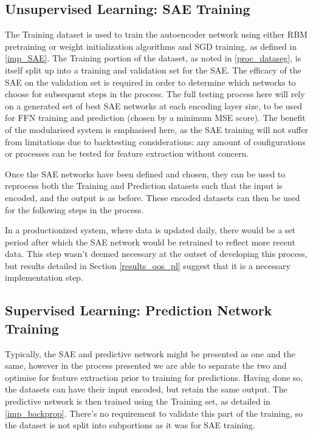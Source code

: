 \documentclass[a4paper,11pt,oneside]{article}
\theoremstyle{plain}
\theoremstyle{definition}
\begin{document}
	\subsection{Unsupervised Learning: SAE Training}\label{proc_sae}
	
	The Training dataset is used to train the autoencoder network using either RBM pretraining or weight initialization algorithms and SGD training, as defined in \ref{imp_SAE}. The Training portion of the dataset, as noted in \ref{proc_dataseg}, is itself split up into a training and validation set for the SAE. The efficacy of the SAE on the validation set is required in order to determine which networks to choose for subsequent steps in the process. The full testing process here will rely on a generated set of best SAE networks at each encoding layer size, to be used for FFN training and prediction (chosen by a minimum MSE score). The benefit of the modularised system is emphasised here, as the SAE training will not suffer from limitations due to backtesting considerations: any amount of configurations or processes can be tested for feature extraction without concern. \newline
	
	Once the SAE networks have been defined and chosen, they can be used to reprocess both the Training and Prediction datasets such that the input is encoded, and the output is as before. These encoded datasets can then be used for the following steps in the process. \newline
	
	In a productionized system, where data is updated daily, there would be a set period after which the SAE network would be retrained to reflect more recent data. This step wasn't deemed necessary at the outset of developing this process, but results detailed in Section \ref{results_oos_pl} suggest that it is a necessary implementation step.\newline
	
	\subsection{Supervised Learning: Prediction Network Training}\label{proc_predictionnetwork}
	
	Typically, the SAE and predictive network might be presented as one and the same, however in the process presented we are able to separate the two and optimise for feature extraction prior to training for predictions. Having done so, the datasets can have their input encoded, but retain the same output. The predictive network is then trained using the Training set, as detailed in \ref{imp_backprop}. There's no requirement to validate this part of the training, so the dataset is not split into subportions as it was for SAE training. \newline
	
\end{document}
